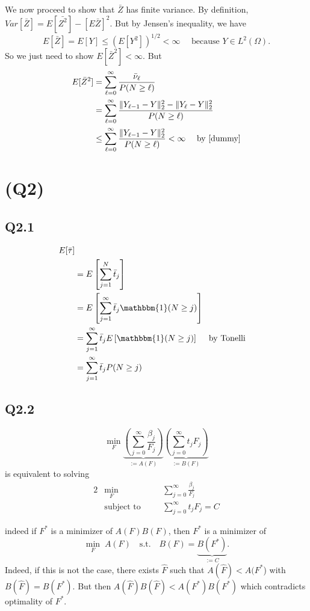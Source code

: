 \documentclass[11pt, a4paper]{article}
\begin{document}
We now proceed to show that $\bar{Z}$ has finite variance.
By definition,  $Var[\bar{Z}]=E[\bar{Z^2}]-\left[E\bar{Z}\right]^2.$ But by Jensen's inequality, we have
$$E[\bar{Z}]=E[Y]\le (E[Y^2])^{1/2}<\infty\quad\text{ because }Y\in L^2(\Omega).$$
So we just need to show $E[\bar{Z}^2]<\infty.$
But 
\begin{align*}
    E[\bar{Z}^2]
    &=\sum_{\ell=0}^{\infty} \frac{\bar{\nu}_\ell}{P(N\ge \ell)}\\
    &=\sum_{\ell=0}^{\infty} \frac{\|Y_{\ell-1}-Y\|_2^2-\|Y_\ell-Y\|_2^2}{P(N\ge \ell)}\\
    &\le\sum_{\ell=0}^{\infty} \frac{\|Y_{\ell-1}-Y\|_2^2}{P(N\ge \ell)}<\infty\quad\text{ by }\ref{dummy}
\end{align*}

\section*{(Q2)}

\subsection*{Q2.1}
\begin{align*}
    E[\bar{\tau}]\\
    &= E\left[\sum_{j=1}^N \bar{t}_j\right]\\
    &= E\left[\sum_{j=1}^{\infty}\bar{t}_j\mathbbm{1}(N\ge j)\right]\\
    &= \sum_{j=1}^{\infty}\bar{t}_jE\left[\mathbbm{1}(N\ge j)\right]\quad\text{ by Tonelli}\\
    &= \sum_{j=1}^{\infty} \bar{t}_jP(N\ge j)
\end{align*}
\subsection*{Q2.2}
$$\min_F \underbrace{\left(\sum_{j=0}^{\infty}\frac{\beta_j}{F_j}\right)}_{:=A(F)}\underbrace{\left(\sum_{j=0}^{\infty}t_j F_j\right)}_{:=B(F)}$$
is equivalent to solving
\begin{alignat*}{2}
    & \min_{F}          && \quad \sum_{j=0}^{\infty}\frac{\beta_j}{F_j}\\[4pt]
    & \text{subject to} && \quad \sum_{j=0}^{\infty}t_jF_j=C
\end{alignat*}

indeed if $F^*$ is a minimizer of $A(F)B(F)$, then $F^*$ is a minimizer of
\begin{equation*}
    \min_{F}\; A(F) \quad \text{s.t.} \quad B(F)=\underbrace{B(F^*)}_{:=C}.
\end{equation*}
Indeed, if this is not
the case, there exists $\hat{F}$ such that $A(\hat{F})<A(F^*$) with
$B(\hat{F})=B(F^*)$. But then $A(\hat{F})B(\hat{F})<A(F^*)B(F^*)$ which
contradicts optimality of $F^*$.
\end{document}
